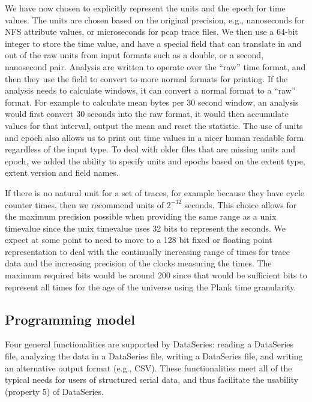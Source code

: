 \documentclass{acm_proc_article-sp}
\begin{document}
We have now chosen to explicitly represent the units and the epoch for
time values.  The units are chosen based on the original precision,
e.g., nanoseconds for NFS attribute values, or microseconds for pcap
trace files.  We then use a 64-bit integer to store the time value,
and have a special field that can translate in and out of the raw
units from input formats such as a double, or a second, nanosecond
pair.  Analysis are written to operate over the ``raw'' time format,
and then they use the field to convert to more normal formats for
printing.  If the analysis needs to calculate windows, it can convert
a normal format to a ``raw'' format.  For example to calculate mean
bytes per 30 second window, an analysis would first convert 30 seconds
into the raw format, it would then accumulate values for that
interval, output the mean and reset the statistic.  The use of units
and epoch also allows us to print out time values in a nicer human
readable form regardless of the input type.  To deal with older files
that are missing units and epoch, we added the ability to specify
units and epochs based on the extent type, extent version and field
names.

If there is no natural unit for a set of traces, for example because
they have cycle counter times, then we recommend units of $2^{-32}$
seconds.  This choice allows for the maximum precision possible when
providing the same range as a unix timevalue since the unix timevalue
uses 32 bits to represent the seconds.  We expect at some point to
need to move to a 128 bit fixed or floating point representation to
deal with the continually increasing range of times for trace data and
the increasing precision of the clocks measuring the times.  The
maximum required bits would be around 200 since that would be
sufficient bits to represent all times for the age of the universe
using the Plank time granularity.


\subsection{Programming model}

Four general functionalities are supported by DataSeries:
reading a DataSeries file, 
analyzing the data in a DataSeries file,
writing a DataSeries file,
and writing an alternative output format (e.g., CSV).
These functionalities meet all of the typical needs for
users of structured serial data, and thus facilitate
the usability (property 5) of DataSeries.
\end{document}
